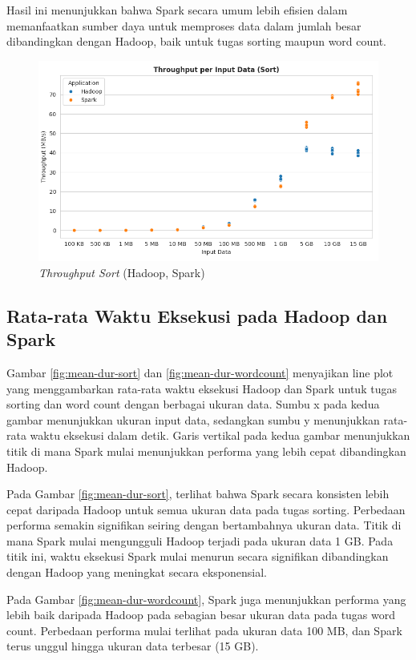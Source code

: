 Hasil ini menunjukkan bahwa Spark secara umum lebih efisien dalam memanfaatkan sumber daya untuk memproses data dalam jumlah besar dibandingkan dengan Hadoop, baik untuk tugas sorting maupun word count.
\begin{figure}[h]
    \centering
    \includegraphics[width=1\textwidth]{figures/ch04/1-throughput-sort.png}
    \caption{\textit{Throughput Sort} (Hadoop, Spark)}
    \label{fig:throughput-sort}
\end{figure}

\subsection {Rata-rata Waktu Eksekusi pada Hadoop dan Spark}
Gambar \ref{fig:mean-dur-sort} dan \ref{fig:mean-dur-wordcount} menyajikan line plot yang menggambarkan rata-rata waktu eksekusi Hadoop dan Spark untuk tugas sorting dan word count dengan berbagai ukuran data. Sumbu x pada kedua gambar menunjukkan ukuran input data, sedangkan sumbu y menunjukkan rata-rata waktu eksekusi dalam detik. Garis vertikal pada kedua gambar menunjukkan titik di mana Spark mulai menunjukkan performa yang lebih cepat dibandingkan Hadoop.

Pada Gambar \ref{fig:mean-dur-sort}, terlihat bahwa Spark secara konsisten lebih cepat daripada Hadoop untuk semua ukuran data pada tugas sorting. Perbedaan performa semakin signifikan seiring dengan bertambahnya ukuran data. Titik di mana Spark mulai mengungguli Hadoop terjadi pada ukuran data 1 GB. Pada titik ini, waktu eksekusi Spark mulai menurun secara signifikan dibandingkan dengan Hadoop yang meningkat secara eksponensial.

Pada Gambar \ref{fig:mean-dur-wordcount}, Spark juga menunjukkan performa yang lebih baik daripada Hadoop pada sebagian besar ukuran data pada tugas word count. Perbedaan performa mulai terlihat pada ukuran data 100 MB, dan Spark terus unggul hingga ukuran data terbesar (15 GB). 

